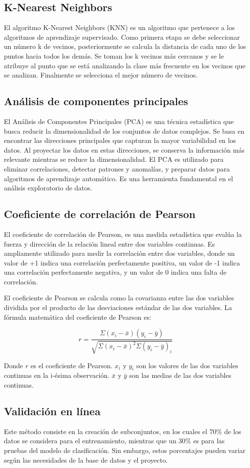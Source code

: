 \subsection{K-Nearest Neighbors}
El algoritmo K-Nearest Neighbors (KNN) es un algoritmo que pertenece a los algoritmos de aprendizaje supervisado. Como primera etapa se debe seleccionar un número k de vecinos, posteriormente se calcula la distancia de cada uno de los puntos hacia todos los demás. Se toman los k vecinos más cercanos y se le atribuye al punto que se está analizando la clase más frecuente en los vecinos que se analizan. Finalmente se selecciona el mejor número de vecinos.

\subsection{Análisis de componentes principales}
El Análisis de Componentes Principales (PCA) es una técnica estadística que busca reducir la dimensionalidad de los conjuntos de datos complejos. Se basa en encontrar las direcciones principales que capturan la mayor variabilidad en los datos. Al proyectar los datos en estas direcciones, se conserva la información más relevante mientras se reduce la dimensionalidad. El PCA es utilizado para eliminar correlaciones, detectar patrones y anomalías, y preparar datos para algoritmos de aprendizaje automático. Es una herramienta fundamental en el análisis exploratorio de datos.

\subsection{Coeficiente de correlación de Pearson}
El coeficiente de correlación de Pearson, es una medida estadística que evalúa la fuerza y dirección de la relación lineal entre dos variables continuas. Es ampliamente utilizado para medir la correlación entre dos variables, donde un valor de +1 indica una correlación perfectamente positiva, un valor de -1 indica una correlación perfectamente negativa, y un valor de 0 indica una falta de correlación.

El coeficiente de Pearson se calcula como la covarianza entre las dos variables dividida por el producto de las desviaciones estándar de las dos variables. La fórmula matemática del coeficiente de Pearson es:

$$r = \frac{\Sigma(x_i - \bar{x})(y_i - \bar{y})}{\sqrt{\Sigma(x_i - \bar{x})^2\Sigma(y_i - \bar{y})_i}}$$

Donde $r$ es el coeficiente de Pearson. $x_i$ y $y_i$ son los valores de las dos variables continuas en la i-ésima observación. $\bar{x}$ y $\bar{y}$ son las medias de las dos variables continuas.

\subsection{Validación en línea}
Este método consiste en la creación de subconjuntos, en los cuales el 70\% de los datos se considera para el entrenamiento, mientras que un 30\% es para las pruebas del modelo de clasificación. Sin embargo, estos porcentajes pueden variar según las necesidades de la base de datos y el proyecto.
